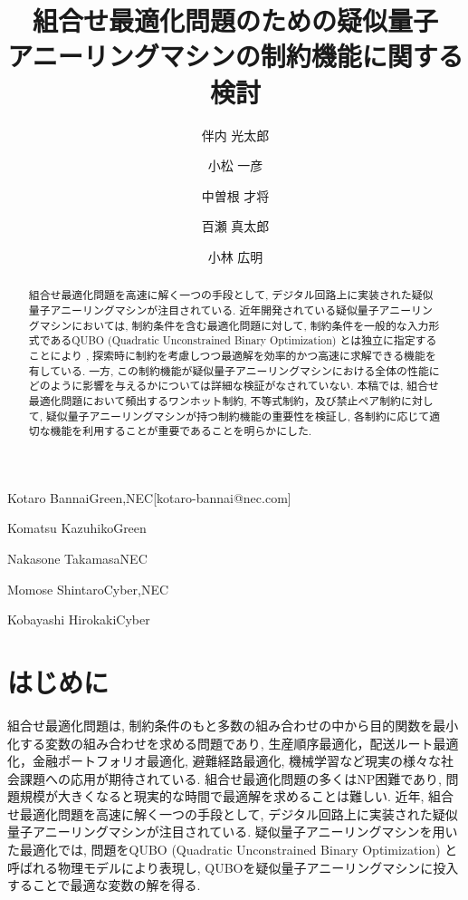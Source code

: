 \documentclass[submit,techrep,noauthor]{ipsj}
\begin{document}
\title{組合せ最適化問題のための疑似量子\\アニーリングマシンの制約機能に関する検討}


\author{伴内 光太郎}{Kotaro Bannai}{Green,NEC}[kotaro-bannai@nec.com]
\author{小松 一彦}{Komatsu Kazuhiko}{Green}
\author{中曽根 才将}{Nakasone Takamasa}{NEC}
\author{百瀬 真太郎}{Momose Shintaro}{Cyber,NEC}
\author{小林 広明}{Kobayashi Hirokaki}{Cyber}

\begin{abstract}
組合せ最適化問題を高速に解く一つの手段として, デジタル回路上に実装された疑似量子アニーリングマシンが注目されている. 近年開発されている疑似量子アニーリングマシンにおいては, 制約条件を含む最適化問題に対して, 制約条件を一般的な入力形式であるQUBO (Quadratic Unconstrained Binary Optimization) とは独立に指定することにより
, 探索時に制約を考慮しつつ最適解を効率的かつ高速に求解できる機能を有している. 一方, この制約機能が疑似量子アニーリングマシンにおける全体の性能にどのように影響を与えるかについては詳細な検証がなされていない. 本稿では, 組合せ最適化問題において頻出するワンホット制約, 不等式制約，及び禁止ペア制約に対して, 疑似量子アニーリングマシンが持つ制約機能の重要性を検証し, 各制約に応じて適切な機能を利用することが重要であることを明らかにした.
\end{abstract}

\maketitle

\section{はじめに}
組合せ最適化問題は, 制約条件のもと多数の組み合わせの中から目的関数を最小化する変数の組み合わせを求める問題であり, 生産順序最適化\cite{jobshop}，配送ルート最適化\cite{isc-onoda}，金融ポートフォリオ最適化\cite{portfolio}, 避難経路最適化\cite{tsunami}, 機械学習\cite{ml}など現実の様々な社会課題への応用が期待されている. 組合せ最適化問題の多くはNP困難であり, 問題規模が大きくなると現実的な時間で最適解を求めることは難しい. 近年, 組合せ最適化問題を高速に解く一つの手段として, デジタル回路上に実装された疑似量子アニーリングマシンが注目されている. 疑似量子アニーリングマシンを用いた最適化では, 問題をQUBO (Quadratic Unconstrained Binary Optimization) と呼ばれる物理モデルにより表現し, QUBOを疑似量子アニーリングマシンに投入することで最適な変数の解を得る.
\end{document}
